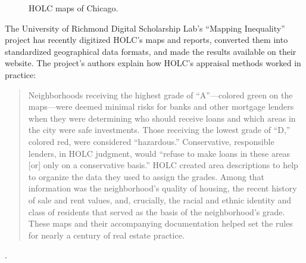 \begin{figure}
\begin{center}
\end{center}
\caption{HOLC maps of Chicago.}
\label{f:chicago-maps}
\end{figure}



The University of Richmond Digital Scholarship Lab's ``Mapping Inequality''
project has recently digitized HOLC's maps and reports, converted them into
standardized geographical data formats, and made the results available on their
website. The project's
authors explain how HOLC's appraisal methods worked in practice:
\begin{quote}
Neighborhoods receiving the highest grade of ``A''---colored green on the
maps---were deemed minimal risks for banks and other mortgage lenders when they
were determining who should receive loans and which areas in the city were safe
investments. Those receiving the lowest grade of ``D,'' colored red, were
considered ``hazardous.'' Conservative, responsible lenders, in HOLC judgment,
would ``refuse to make loans in these areas [or] only on a conservative
basis.'' HOLC created area descriptions to help to organize the data they used
to assign the grades. Among that information was the neighborhood's quality of
housing, the recent history of sale and rent values, and, crucially, the racial
and ethnic identity and class of residents that served as the basis of the
neighborhood's grade. These maps and their accompanying documentation helped
set the rules for nearly a century of real estate practice.
\end{quote}
.

